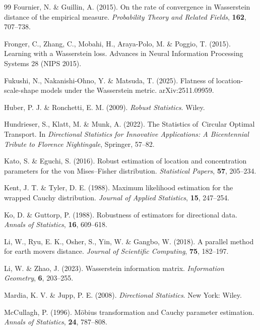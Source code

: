 \documentclass[11pt, a4paper]{article}
\begin{document}
\begin{thebibliography}{99}
Fournier, N. \& Guillin, A. (2015).
On the rate of convergence in Wasserstein distance of the empirical measure. 
\textit{Probability Theory and Related Fields}, \textbf{162}, 707--738.

Fronger, C., Zhang, C., Mobahi, H., Araya-Polo, M. \& Poggio, T. (2015).
Learning with a Wasserstein loss. 
Advances in Neural Information Processing Systems 28 (NIPS 2015).

Fukushi, N., Nakanishi-Ohno, Y. \& Matsuda, T. (2025).
Flatness of location-scale-shape models under the Wasserstein metric.
arXiv:2511.09959.

{Huber, P. J.} \& Ronchetti, E. M. (2009).
\textit{Robust Statistics}.
Wiley.

Hundrieser, S., Klatt, M. \& Munk, A. (2022).
The Statistics of~Circular Optimal Transport.
In \textit{Directional Statistics for Innovative Applications: A Bicentennial Tribute to Florence Nightingale}, Springer, 57--82.

Kato, S. \& Eguchi, S. (2016).
Robust estimation of location and concentration parameters for the von Mises–Fisher distribution.
\textit{Statistical Papers}, \textbf{57}, 205--234.

Kent, J. T. \& Tyler, D. E. (1988).
Maximum likelihood estimation for the wrapped Cauchy distribution.
\textit{Journal of Applied Statistics}, \textbf{15}, 247--254.

Ko, D. \& Guttorp, P. (1988).
Robustness of estimators for directional data.
\textit{Annals of Statistics}, \textbf{16}, 609--618.

Li, W., Ryu, E. K., Osher, S., Yin, W. \& Gangbo, W. (2018).
A parallel method for earth movers distance.
\textit{Journal of Scientific Computing}, \textbf{75}, 182--197.

Li, W. \& Zhao, J. (2023).
Wasserstein information matrix.
\textit{Information Geometry}, \textbf{6}, 203--255.

{Mardia, K. V.} \& {Jupp, P. E.} (2008).
\textit{Directional Statistics}.
New York: Wiley.

McCullagh, P. (1996).
Möbius transformation and Cauchy parameter estimation. 
\textit{Annals of Statistics}, \textbf{24}, 787--808.


\end{thebibliography}
\end{document}
